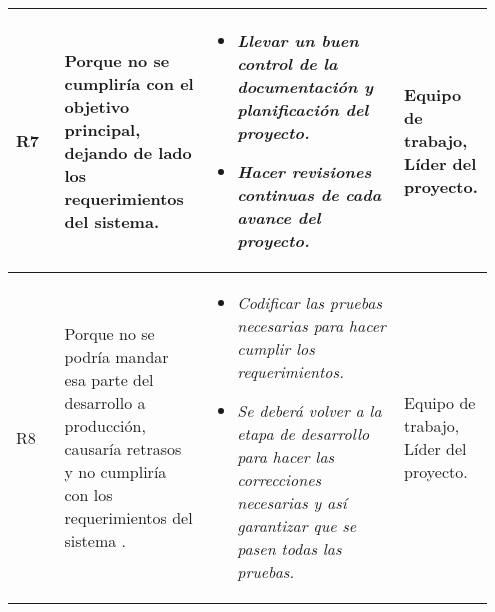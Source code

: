 \documentclass[12pt,a4paper]{article}
\begin{document}
\begin{table}[h!]
\begin{tabular}{|p{0.10\linewidth}|p{0.30\linewidth}|p{0.40\linewidth}|p{0.15\linewidth}|}
R7&Porque no se cumpliría con el objetivo principal, dejando de lado los requerimientos del sistema.&\begin{itemize}
\item \textit{Llevar un buen control de la documentación y planificación del proyecto.}
\item \textit{Hacer revisiones continuas de cada avance del proyecto.}
\end{itemize} 
&Equipo de trabajo, Líder del proyecto.\\\hline

R8&Porque no se podría mandar esa parte del desarrollo a producción, causaría retrasos y no cumpliría con los requerimientos del sistema .&\begin{itemize}
\item \textit{Codificar las pruebas necesarias para hacer cumplir los requerimientos.}
\item \textit{Se deberá volver a la etapa de desarrollo para hacer las correcciones necesarias y así garantizar que se pasen todas las pruebas.}
\end{itemize} 
&Equipo de trabajo, Líder del proyecto.\\\hline

\end{tabular}
\end{table}
\end{document}
